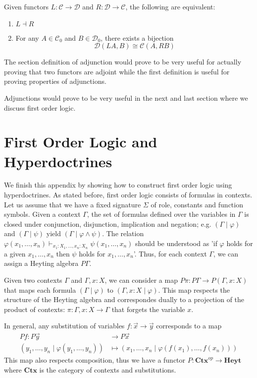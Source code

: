 \begin{theorem}
    Given functors $L:\mathcal{C}\to\mathcal{D}$ and $R:\mathcal{D}\to\mathcal{C}$,
    the following are equivalent:
    \begin{enumerate}
        \item $L\dashv R$
        \item For any $A\in\mathcal{C}_0$ and $B\in\mathcal{D}_0$,
        there exists a bijection
        \[
            \mathcal{D}(LA,B)\cong \mathcal{C}(A,RB)
        \]
    \end{enumerate}
\end{theorem}

The section definition of adjunction would prove to be very useful for actually
proving that two functors are adjoint while the first definition is useful
for proving properties of adjunctions.

Adjunctions would prove to be very useful in the next and last section
where we discuss first order logic.

\section{First Order Logic and Hyperdoctrines}
We finish this appendix by showing how to construct first order logic using hyperdoctrines.
As stated before, first order logic consists of formulas in contexts.
Let us assume that we have a fixed signature $\Sigma$ of role, constants and function symbols.
Given a context $\Gamma$, the set of formulas defined over the variables in $\Gamma$
is closed under conjunction, disjunction, implication and negation;
e.g. $(\Gamma\mid\varphi)$ and $(\Gamma\mid\psi)$ yield $(\Gamma\mid\varphi\wedge\psi)$.
The relation $\varphi(x_1,\dots,x_n)\vdash_{x_1:X_1,\dots,x_n:X_n}\psi(x_1,\dots,x_n)$
should be understood as 'if $\varphi$ holds for a given $x_1,\dots,x_n$ 
then $\psi$ holds for $x_1,\dots,x_n$'.
Thus, for each context $\Gamma$,
we can assign a Heyting algebra $P\Gamma$.

Given two contexts $\Gamma$ and $\Gamma,x:X$,
we can consider a map $P\pi:P\Gamma\to P(\Gamma,x:X)$
that maps each formula $(\Gamma\mid \varphi)$ to $(\Gamma,x:X\mid \varphi)$.
This map respects the structure of the Heyting algebra and 
correspondes dually to a projection of the
product of contexts:
$\pi:\Gamma,x:X\to\Gamma$
that forgets the variable $x$.

In general, any substitution of variables $f:\vec{x}\to\vec{y}$
corresponds to a map  
\begin{align*}
    Pf:P\vec{y}&\to P\vec{x}
    \\
    (y_1,\dots,y_n\mid \varphi(y_1,\dots,y_n))&\mapsto 
    (x_1,\dots,x_n\mid \varphi(f(x_1),\dots,f(x_n)))
\end{align*}
This map also respects composition,
thus we have a functor $P:\mathbf{Ctx}^{op}\to\mathbf{Heyt}$
where $\mathbf{Ctx}$ is the category of contexts and substitutions.

